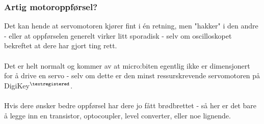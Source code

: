 \documentclass[11pt,a4paper]{article}
\begin{document}
\subsubsection{Artig motoroppførsel?}
Det kan hende at servomotoren kjører fint i én retning, men "hakker" i den andre - eller at oppførselen generelt virker litt sporadisk - selv om oscilloskopet bekreftet at dere har gjort ting rett.\\
\\
Det er helt normalt og kommer av at micro:biten egentlig ikke er dimensjonert for å drive en servo - selv om dette er den minst ressurskrevende servomotoren på DigiKey$^{\tiny{\textregistered}}$.\\
\\
Hvis dere ønsker bedre oppførsel har dere jo fått brødbrettet - så her er det bare å legge inn en transistor, optocoupler, level converter, eller noe lignende.




\newpage
\appendix
\end{document}
